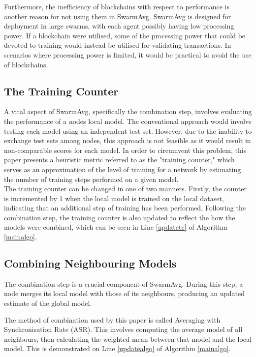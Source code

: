 \documentclass[letterpaper, 10 pt, conference]{ieeeconf}  %
\begin{document}
Furthermore, the inefficiency of blockchains with respect to performance is another reason for not using them in SwarmAvg. SwarmAvg is designed for deployment in large swarms, with each agent possibly having low processing power. If a blockchain were utilised, some of the processing power that could be devoted to training would instead be utilised for validating transactions. In scenarios where processing power is limited, it would be practical to avoid the use of blockchains.

\subsection{The Training Counter}
A vital aspect of SwarmAvg, specifically the combination step, involves evaluating the performance of a nodes local model. The conventional approach would involve testing each model using an independent test set. However, due to the inability to exchange test sets among nodes, this approach is not feasible as it would result in non-comparable scores for each model. In order to circumvent this problem, this paper presents a heuristic metric referred to as the "training counter," which serves as an approximation of the level of training for a network by estimating the number of training steps performed on a given model. \\

The training counter can be changed in one of two manners. Firstly, the counter is incremented by 1 when the local model is trained on the local dataset, indicating that an additional step of training has been performed. Following the combination step, the training counter is also updated to reflect the how the models were combined, which can be seen in Line \ref{updatetc} of Algorithm \ref{mainalgo}.

\subsection{Combining Neighbouring Models} \label{mcm}
The combination step is a crucial component of SwarmAvg. During this step, a node merges its local model with those of its neighbours, producing an updated estimate of the global model.

The method of combination used by this paper is called Averaging with Synchronisation Rate (ASR). This involves computing the average model of all neighbours, then calculating the weighted mean between that model and the local model. This is demonstrated on Line \ref{updatealgo} of Algorithm \ref{mainalgo}.
\end{document}
